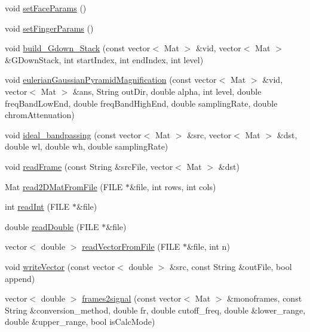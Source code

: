 \begin{DoxyCompactItemize}
\item 
void \hyperlink{namespace_m_h_r_a48555f02f08d43ff1f06f9413c86b5ca}{set\+Face\+Params} ()
\item 
void \hyperlink{namespace_m_h_r_af336ca7b239bbe520636c7d147b913b5}{set\+Finger\+Params} ()
\item 
void \hyperlink{namespace_m_h_r_ae1292cc4cfc5411226e0cd77f652e1a5}{build\+\_\+\+Gdown\+\_\+\+Stack} (const vector$<$ Mat $>$ \&vid, vector$<$ Mat $>$ \&G\+Down\+Stack, int start\+Index, int end\+Index, int level)
\item 
void \hyperlink{namespace_m_h_r_af2ec0b4fd5bc225e5e008504e70475a7}{eulerian\+Gaussian\+Pyramid\+Magnification} (const vector$<$ Mat $>$ \&vid, vector$<$ Mat $>$ \&ans, String out\+Dir, double alpha, int level, double freq\+Band\+Low\+End, double freq\+Band\+High\+End, double sampling\+Rate, double chrom\+Attenuation)
\item 
void \hyperlink{namespace_m_h_r_a103bcf8925254f7ca646192777866d4b}{ideal\+\_\+bandpassing} (const vector$<$ Mat $>$ \&src, vector$<$ Mat $>$ \&dst, double wl, double wh, double sampling\+Rate)
\item 
void \hyperlink{namespace_m_h_r_a3b899245a37e41550b80b44fb40fe3e9}{read\+Frame} (const String \&src\+File, vector$<$ Mat $>$ \&dst)
\item 
Mat \hyperlink{namespace_m_h_r_aca720721cf34fb61faddf517a6f1ecb7}{read2\+D\+Mat\+From\+File} (F\+I\+L\+E $\ast$\&file, int rows, int cols)
\item 
int \hyperlink{namespace_m_h_r_aca054bab24695d684662a7972fc07d02}{read\+Int} (F\+I\+L\+E $\ast$\&file)
\item 
double \hyperlink{namespace_m_h_r_a30d68a835eaf7530b13d542662a88642}{read\+Double} (F\+I\+L\+E $\ast$\&file)
\item 
vector$<$ double $>$ \hyperlink{namespace_m_h_r_a8b31e05ada67db2ce123a0674568ad29}{read\+Vector\+From\+File} (F\+I\+L\+E $\ast$\&file, int n)
\item 
void \hyperlink{namespace_m_h_r_a391cd23b86d2d7411411d4595cb74b86}{write\+Vector} (const vector$<$ double $>$ \&src, const String \&out\+File, bool append)
\item 
vector$<$ double $>$ \hyperlink{namespace_m_h_r_a53c0c282e2b27534f2726f735f9664e3}{frames2signal} (const vector$<$ Mat $>$ \&monoframes, const String \&conversion\+\_\+method, double fr, double cutoff\+\_\+freq, double \&lower\+\_\+range, double \&upper\+\_\+range, bool is\+Calc\+Mode)

\end{DoxyCompactItemize}
